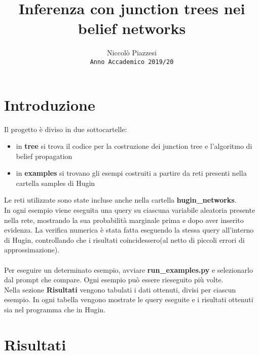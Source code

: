 \documentclass{report}
\begin{document}
\title{ \textbf{Inferenza con junction trees nei belief networks}}
\author{Niccolò Piazzesi\\ \texttt{Anno Accademico 2019/20}}
\date{}
\maketitle

\section*{Introduzione}
Il progetto è diviso in due sottocartelle:
\begin{itemize}
\item in \textbf{tree} si trova il codice per la costruzione dei junction tree e l'algoritmo di belief propagation
\item in \textbf{examples} si trovano gli esempi costruiti a partire da  reti presenti nella cartella samples di Hugin
\end{itemize}

\noindent Le reti utilizzate sono state  incluse anche nella cartella \textbf{hugin\_networks}.\\
In ogni esempio viene eseguita una query su ciascuna variabile aleatoria presente nella rete, mostrando  la sua probabilità marginale  prima e dopo aver inserito evidenza. La verifica numerica  è stata fatta eseguendo la stessa query all'interno di Hugin, controllando che i risultati coincidessero(al netto di piccoli errori di approssimazione). \\\\
\noindent Per eseguire un determinato esempio, avviare \textbf{run\_examples.py} e selezionarlo dal prompt che compare. Ogni esempio può essere rieseguito più volte.\\

\noindent Nella sezione \textbf{Risultati} vengono tabulati i dati ottenuti, divisi per ciascun esempio. In ogni tabella vengono mostrate le query eseguite e i risultati ottenuti sia nel programma che in Hugin.
\newpage
\section*{Risultati}
\end{document}
